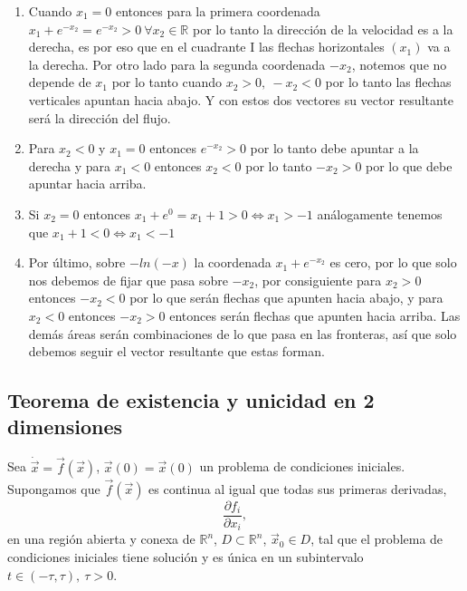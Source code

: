 \begin{ejemplo}
\begin{enumerate}
  \item Cuando $x_1=0$ entonces para la primera coordenada $x_1+e^{-x_2}=e^{-x_2} > 0 \ \forall x_2 \in \mathbb{R}$ por lo tanto la dirección de la velocidad es a la derecha, es por eso que en el cuadrante I las flechas horizontales $(x_1)$ va a la derecha. Por otro lado para la segunda coordenada $-x_2$, notemos que no depende de $x_1$ por lo tanto cuando $x_2>0 ,\ -x_2<0$ por lo tanto las flechas verticales apuntan hacia abajo. Y con estos dos vectores su vector resultante será la dirección del flujo.
  \item Para $x_2<0$ y $x_1=0$ entonces $e^{-x_2}>0$ por lo tanto debe apuntar a la derecha y para $x_1<0$ entonces $x_2<0$ por lo tanto $-x_2>0$ por lo que debe apuntar hacia arriba.
  \item Si $x_2=0$ entonces $x_1+e^{0}=x_1+1>0 \iff x_1>-1 $ análogamente tenemos que $x_1+1<0 \iff x_1<-1$
  \item Por último, sobre $-ln(-x)$ la coordenada  $x_1+e^{-x_2}$ es cero, por lo que solo nos debemos de fijar que pasa sobre $-x_2$, por consiguiente para $x_2>0$ entonces $-x_2<0$ por lo que serán flechas que apunten hacia abajo, y para $x_2<0$ entonces $-x_2>0$ entonces serán flechas que apunten hacia arriba. Las demás áreas serán combinaciones de lo que pasa en las fronteras, así que solo debemos seguir el vector resultante que estas forman.             
\end{enumerate}


\end{ejemplo}

\subsection{Teorema de existencia y unicidad en 2 dimensiones}

\begin{tcolorbox}[colback=Black!4,colframe=White]
\begin{teorema}
  Sea $\dot{\vec{x}}=\vec{f}(\vec{x})$, $\vec{x}(0)=\vec{x}(0)$ un problema de condiciones iniciales. Supongamos que $\vec{f}(\vec{x})$ es continua al igual que todas sus primeras derivadas, $$
  \frac{\partial f_i}{\partial x_i}, 
  $$ en una región abierta y conexa de $\mathbb{R}^{n}$, $D \subset \mathbb{R}^{n}$, $\vec{x}_0 \in D$, tal que el problema de condiciones iniciales tiene solución y es única en un subintervalo $t \in (-\tau,\tau),\ \tau>0$.
  
\end{teorema}
\end{tcolorbox}

